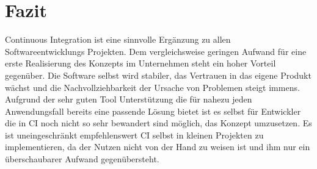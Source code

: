 \pagebreak

\chapter{Fazit}
Continuous Integration ist eine sinnvolle Ergänzung zu allen Softwareentwicklungs Projekten. Dem vergleichsweise geringen Aufwand für eine erste Realisierung des Konzepts im Unternehmen steht ein hoher Vorteil gegenüber. Die Software selbst wird stabiler, das Vertrauen in das eigene Produkt wächst und die Nachvollziehbarkeit der Ursache von Problemen steigt immens.
Aufgrund der sehr guten Tool Unterstützung die für nahezu jeden Anwendungsfall bereits eine passende Lösung bietet ist es selbst für Entwickler die in CI noch nicht so sehr bewandert sind möglich, das Konzept umzusetzen.
Es ist uneingeschränkt empfehlenswert CI selbst in kleinen Projekten zu implementieren, da der Nutzen nicht von der Hand zu weisen ist und ihm nur ein überschaubarer Aufwand gegenübersteht.
